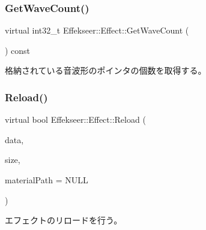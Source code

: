 \subsubsection{\texorpdfstring{Get\+Wave\+Count()}{GetWaveCount()}}
{\footnotesize\ttfamily virtual int32\+\_\+t Effekseer\+::\+Effect\+::\+Get\+Wave\+Count (\begin{DoxyParamCaption}{ }\end{DoxyParamCaption}) const\hspace{0.3cm}{\ttfamily [pure virtual]}}



格納されている音波形のポインタの個数を取得する。 

\mbox{\label{class_effekseer_1_1_effect_a32c3c8d5a582f7ebaad34b1fb32e6d70}} 
\subsubsection{\texorpdfstring{Reload()}{Reload()}\hspace{0.1cm}{\footnotesize\ttfamily [1/4]}}
{\footnotesize\ttfamily virtual bool Effekseer\+::\+Effect\+::\+Reload (\begin{DoxyParamCaption}\item[{\mbox{\hyperlink{namespace_effekseer_ab34c4088e512200cf4c2716f168deb56}{void}} $\ast$}]{data,  }\item[{int32\+\_\+t}]{size,  }\item[{const \mbox{\hyperlink{_effekseer_8h_a50b026abea014b47854bcd835b3b6233}{E\+F\+K\+\_\+\+C\+H\+AR}} $\ast$}]{material\+Path = {\ttfamily NULL} }\end{DoxyParamCaption})\hspace{0.3cm}{\ttfamily [pure virtual]}}



エフェクトのリロードを行う。 

\mbox{\label{class_effekseer_1_1_effect_acd86f6147154097e727246f7671d99ef}} 

